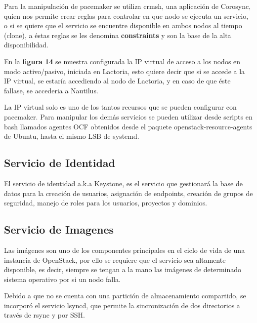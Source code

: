     
    Para la manipulación de pacemaker se utiliza crmsh, una aplicación de Corosync, quien nos permite crear reglas para controlar en que nodo se ejecuta un servicio, o si se quiere que el servicio se encuentre disponible en ambos nodos al tiempo (clone), a éstas reglas se les denomina \textbf{constraints} y son la base de la alta disponibilidad.
    
    
    En la \textbf{figura 14} se muestra configurada la IP virtual de acceso a los nodos en modo activo/pasivo, iniciada en Lactoria, esto quiere decir que si se accede a la IP virtual, se estaría accediendo al nodo de Lactoria, y en caso de que éste fallase, se accederia a Nautilus.
    
    La IP virtual solo es uno de los tantos recursos que se pueden configurar con pacemaker. Para manipular los demás servicios se pueden utilizar desde scripts en bash llamados agentes OCF obtenidos desde el paquete openstack-resource-agents de Ubuntu, hasta el mismo LSB de systemd.
    
    
    
    \subsection{Servicio de Identidad}
    
    El servicio de identidad a.k.a Keystone, es el servicio que gestionará la base de datos para la creación de usuarios, asignación de endpoints, creación de grupos de seguridad, manejo de roles para los usuarios, proyectos y dominios.
    
    
    \subsection{Servicio de Imagenes}
    
    Las imágenes son uno de los componentes principales en el ciclo de vida de una instancia de OpenStack, por ello se requiere que el servicio sea altamente disponible, es decir, siempre se tengan a la mano las imágenes de determinado sistema operativo por si un nodo falla.
    
    Debido a que no se cuenta con una partición de almacenamiento compartido, se incorporó el servicio lsyncd, que permite la sincronización de dos directorios a través de rsync y por SSH.
    
